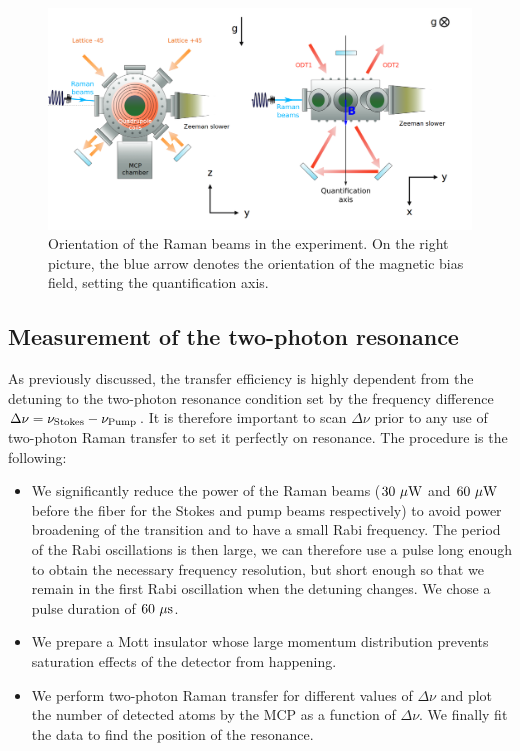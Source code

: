 \begin{figure}
    \centering
    \includegraphics[width=\textwidth]{Fig/Chapter3/raman_sc.png}
    \caption{Orientation of the Raman beams in the experiment. On the right picture, the blue arrow denotes the orientation of the magnetic bias field, setting the quantification axis.}
    \label{fig:raman_sc}
\end{figure}

\subsection{Measurement of the two-photon resonance}

As previously discussed, the transfer efficiency is highly dependent from the detuning to the two-photon resonance condition set by the frequency difference $\Delta \nu = \nu_{\rm{Stokes}} - \nu_{\rm{Pump}}$. It is therefore important to scan $\Delta \nu$ prior to any use of two-photon Raman transfer to set it perfectly on resonance. The procedure is the following:

\begin{itemize}
    \item We significantly reduce the power of the Raman beams ($30 \ \mu \rm{W}$ and $60 \ \mu \rm{W}$ before the fiber for the Stokes and pump beams respectively) to avoid power broadening of the transition and to have a small Rabi frequency. The period of the Rabi oscillations is then large, we can therefore use a pulse long enough to obtain the necessary frequency resolution, but short enough so that we remain in the first Rabi oscillation when the detuning changes. We chose a pulse duration of $60 \ \mu \rm{s}$. 
    \item We prepare a Mott insulator whose large momentum distribution prevents saturation effects of the detector from happening.
    \item We perform two-photon Raman transfer for different values of $\Delta \nu$ and plot the number of detected atoms by the MCP as a function of $\Delta \nu$. We finally fit the data to find the position of the resonance. 
\end{itemize}


